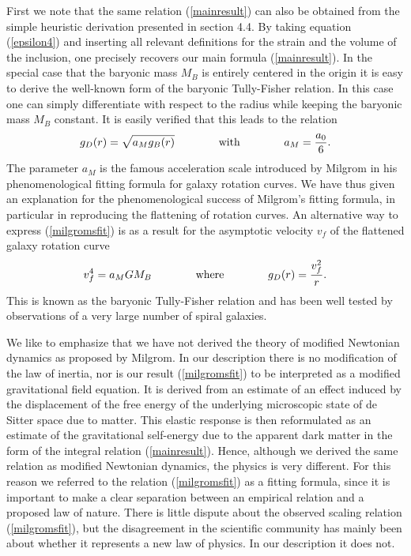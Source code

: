 \documentclass[a4paper,12pt]{article}
\begin{document}
First we note that the same relation (\ref{mainresult}) can also be obtained from the simple heuristic derivation presented in section 4.4. By taking equation (\ref{epsilon4}) and inserting all relevant definitions for the strain and the volume of the inclusion, one precisely recovers our main formula (\ref{mainresult}). In the special case that the baryonic mass $M_B$ is entirely centered in the origin it is  easy to derive the well-known form of the baryonic Tully-Fisher relation. 
In this case one can simply differentiate with respect to the radius while keeping the baryonic mass $M_B$ constant. It is easily verified that this leads to the relation 
\begin{equation}
\label{milgromsfit}
g_D(r) = \sqrt{a_M g_B(r)} \qquad \qquad\mbox{with}\qquad\qquad a_M= {a_0\over 6}	 .
\end{equation}
The parameter $a_M$ is the famous acceleration scale introduced by Milgrom \cite{Milgrom:1983}
in his phenomenological fitting formula for galaxy rotation curves.  We have thus given an explanation for the phenomenological success of Milgrom's fitting formula, in particular in reproducing the flattening of rotation curves. 
An alternative way to express (\ref{milgromsfit}) is as a result for the asymptotic velocity $v_{f}$ of the flattened galaxy rotation curve
\begin{equation}
\label{TFrel}
 v_{f}^4 = a_M G M_B 	\qquad\qquad
\mbox{where} \qquad\qquad g_D(r) = {v^2_{f}\over r}.
\end{equation}
This is known as the baryonic Tully-Fisher relation and has been well tested by observations 
\cite{TF-relation,McGaugh2016} of a very large number of spiral galaxies.  


We like to emphasize that we have not derived the theory of modified Newtonian dynamics as proposed by Milgrom. In our description there is no modification of the law of inertia, nor is our result (\ref{milgromsfit}) to be interpreted as a modified gravitational field equation. It is derived from an estimate of an effect induced by the displacement of the free energy of the underlying microscopic state of de Sitter space due to matter. This elastic response is then reformulated as an estimate of the gravitational self-energy due to the apparent dark matter in the form of the integral relation (\ref{mainresult}). 
Hence, although we derived the same relation as modified Newtonian dynamics, the physics is very different. For this reason we referred to the relation (\ref{milgromsfit}) as a fitting formula, since it is important to make a clear separation between an empirical relation and a proposed law of nature. There is little dispute about the observed scaling relation (\ref{milgromsfit}), but the  disagreement in the scientific community has mainly been about whether it represents a new law of physics. In our description it does not. 
\end{document}
